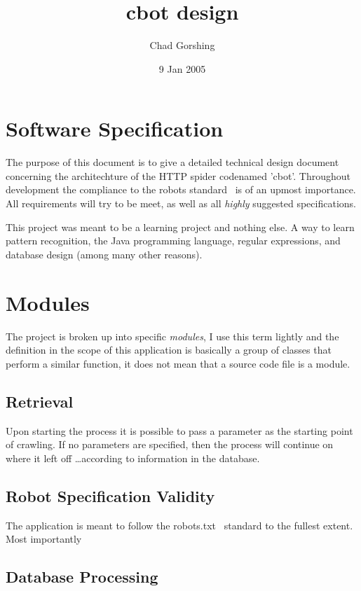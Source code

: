 \documentclass[a4paper,12pt]{article}
\begin{document}
\title{cbot design}
\author{Chad Gorshing}
\date{9 Jan 2005}
\maketitle
\tableofcontents
\newpage
\section{Software Specification}

The purpose of this document is to give a detailed technical design document
concerning the architechture of the HTTP spider codenamed 'cbot'.  Throughout
development the compliance to the robots standard~\cite{robotsStandard} is of
an upmost importance. All requirements will try to be meet, as well as all
\emph{highly} suggested specifications.

This project was meant to be a learning project and nothing else.  A way to
learn pattern recognition, the Java programming language, regular expressions,
and database design (among many other reasons).

\section{Modules}

The project is broken up into specific \emph{modules}, I use this term lightly
and the definition in the scope of this application is basically a group of
classes that perform a similar function, it does not mean that a source code
file is a module.

\subsection{Retrieval}

Upon starting the process it is possible to pass a parameter as the starting
point of crawling. If no parameters are specified, then the process will
continue on where it left off \ldots according to information in the database.

\subsection{Robot Specification Validity}

The application is meant to follow the robots.txt~\cite{robotsStandard} standard to the fullest extent. Most importantly 

\subsection{Database Processing}
\end{document}
